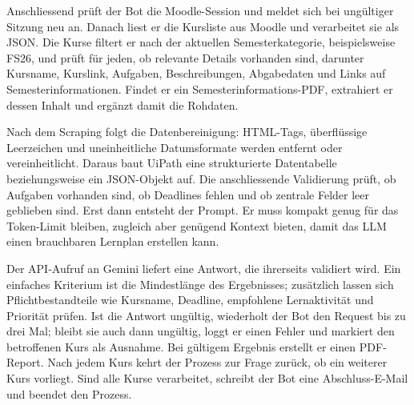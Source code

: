 \documentclass[11pt]{scrartcl}
\begin{document}
Anschliessend prüft der Bot die Moodle-Session und meldet sich bei ungültiger Sitzung neu an. Danach liest er die Kursliste aus Moodle und verarbeitet sie als JSON. Die Kurse filtert er nach der aktuellen Semesterkategorie, beispielsweise FS26, und prüft für jeden, ob relevante Details vorhanden sind, darunter Kursname, Kurslink, Aufgaben, Beschreibungen, Abgabedaten und Links auf Semesterinformationen. Findet er ein Semesterinformations-PDF, extrahiert er dessen Inhalt und ergänzt damit die Rohdaten.

Nach dem Scraping folgt die Datenbereinigung: HTML-Tags, überflüssige Leerzeichen und uneinheitliche Datumsformate werden entfernt oder vereinheitlicht. Daraus baut UiPath eine strukturierte Datentabelle beziehungsweise ein JSON-Objekt auf. Die anschliessende Validierung prüft, ob Aufgaben vorhanden sind, ob Deadlines fehlen und ob zentrale Felder leer geblieben sind. Erst dann entsteht der Prompt. Er muss kompakt genug für das Token-Limit bleiben, zugleich aber genügend Kontext bieten, damit das LLM einen brauchbaren Lernplan erstellen kann.

Der API-Aufruf an Gemini liefert eine Antwort, die ihrerseits validiert wird. Ein einfaches Kriterium ist die Mindestlänge des Ergebnisses; zusätzlich lassen sich Pflichtbestandteile wie Kursname, Deadline, empfohlene Lernaktivität und Priorität prüfen. Ist die Antwort ungültig, wiederholt der Bot den Request bis zu drei Mal; bleibt sie auch dann ungültig, loggt er einen Fehler und markiert den betroffenen Kurs als Ausnahme. Bei gültigem Ergebnis erstellt er einen PDF-Report. Nach jedem Kurs kehrt der Prozess zur Frage zurück, ob ein weiterer Kurs vorliegt. Sind alle Kurse verarbeitet, schreibt der Bot eine Abschluss-E-Mail und beendet den Prozess.
\end{document}
